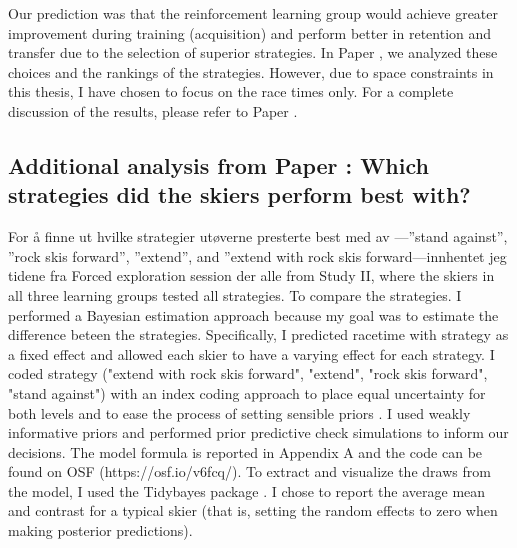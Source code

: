Our prediction was that the reinforcement learning group would achieve greater improvement during training (acquisition) and perform better in retention and transfer due to the selection of superior strategies. In Paper , we analyzed these choices and the rankings of the strategies. However, due to space constraints in this thesis, I have chosen to focus on the race times only. For a complete discussion of the results, please refer to Paper .


\subsection{Additional analysis from Paper : Which strategies did the skiers perform best with?}
For å finne ut hvilke strategier utøverne presterte best med av —”stand against”, ”rock skis forward”, ”extend”, and ”extend with rock skis forward—innhentet jeg tidene fra Forced exploration session der alle from Study II, where the skiers in all three learning groups tested all strategies.  To compare the strategies. I performed a Bayesian estimation approach because my goal was to estimate the difference beteen the strategies. Specifically, I predicted racetime with strategy as a fixed effect and allowed each skier to have a varying effect for each strategy. I coded strategy ("extend with rock skis forward", "extend", "rock skis forward", "stand against") with an index coding approach to place equal uncertainty for both levels and to ease the process of setting sensible priors \cite{mcelreath_statistical_2018}. I used weakly informative priors and performed prior predictive check simulations to inform our decisions. The model formula is reported in Appendix A and the code can be found on OSF (https://osf.io/v6fcq/). To extract and visualize the draws from the model, I used the Tidybayes package \cite{kay_tidybayes_nodate}. I chose to report the average mean and contrast for a typical skier (that is, setting the random effects to zero when making posterior predictions). 























